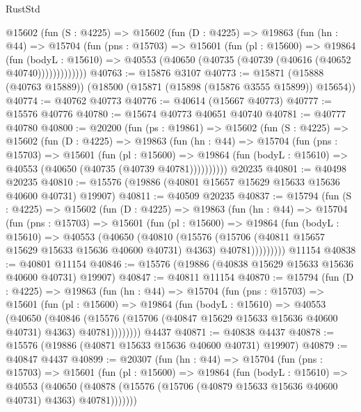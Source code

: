 \begin{lexlean}{RustStd}
\begin{coremodule}
      @15602
        (fun (S : @4225) =>
        @15602
          (fun (D : @4225) =>
          @19863
            (fun (hn : @44) =>
            @15704
              (fun (pns : @15703) =>
              @15601
                (fun (pl : @15600) =>
                @19864
                  (fun (bodyL : @15610) =>
                  @40553 (@40650 (@40735 (@40739 (@40616 (@40652 @40740)))))))))))))
@40763 := @15876 @3107
@40773 := @15871 (@15888 (@40763 @15889)) (@18500 (@15871 (@15898 (@15876 @3555 @15899)) @15654))
@40774 := @40762 @40773
@40776 := @40614 (@15667 @40773)
@40777 := @15576 @40776
@40780 := @15674 @40773 @40651 @40740
@40781 := @40777 @40780
@40800 := @20200
    (fun (ps : @19861) =>
    @15602
      (fun (S : @4225) =>
      @15602
        (fun (D : @4225) =>
        @19863
          (fun (hn : @44) =>
          @15704
            (fun (pns : @15703) =>
            @15601
              (fun (pl : @15600) =>
              @19864 (fun (bodyL : @15610) => @40553 (@40650 (@40735 (@40739 @40781))))))))))
    @20235
@40801 := @40498 @20235
@40810 := @15576 (@19886 (@40801 @15657 @15629 @15633 @15636 @40600 @40731) @19907)
@40811 := @40509 @20235
@40837 := @15794
    (fun (S : @4225) =>
    @15602
      (fun (D : @4225) =>
      @19863
        (fun (hn : @44) =>
        @15704
          (fun (pns : @15703) =>
          @15601
            (fun (pl : @15600) =>
            @19864
              (fun (bodyL : @15610) =>
              @40553
                (@40650
                  (@40810
                    (@15576
                      (@15706 (@40811 @15657 @15629 @15633 @15636 @40600 @40731) @4363)
                      @40781)))))))))
    @11154
@40838 := @40801 @11154
@40846 := @15576 (@19886 (@40838 @15629 @15633 @15636 @40600 @40731) @19907)
@40847 := @40811 @11154
@40870 := @15794
    (fun (D : @4225) =>
    @19863
      (fun (hn : @44) =>
      @15704
        (fun (pns : @15703) =>
        @15601
          (fun (pl : @15600) =>
          @19864
            (fun (bodyL : @15610) =>
            @40553
              (@40650
                (@40846
                  (@15576 (@15706 (@40847 @15629 @15633 @15636 @40600 @40731) @4363) @40781))))))))
    @4437
@40871 := @40838 @4437
@40878 := @15576 (@19886 (@40871 @15633 @15636 @40600 @40731) @19907)
@40879 := @40847 @4437
@40899 := @20307
    (fun (hn : @44) =>
    @15704
      (fun (pns : @15703) =>
      @15601
        (fun (pl : @15600) =>
        @19864
          (fun (bodyL : @15610) =>
          @40553
            (@40650
              (@40878 (@15576 (@15706 (@40879 @15633 @15636 @40600 @40731) @4363) @40781)))))))

\end{coremodule}
\end{lexlean}

